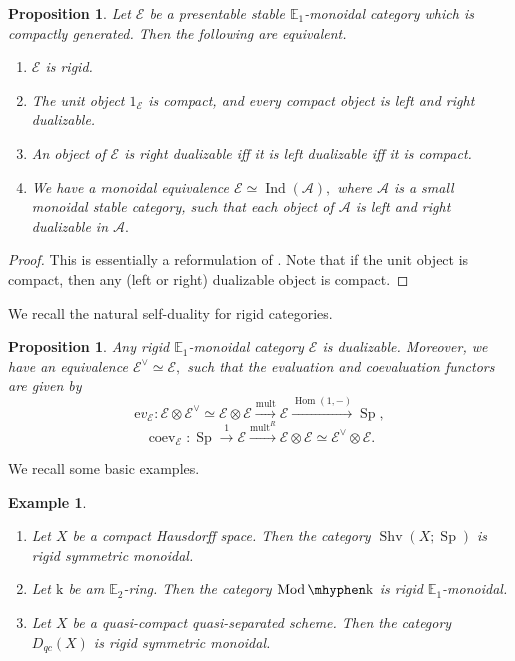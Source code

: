 \documentclass[11pt,leqno]{amsart}
\newtheorem{prop}[theo]{Proposition}
\newtheorem{example}[theo]{Example}
\numberwithin{equation}{section}
\def\Hom{\operatorname{Hom}}
\newcommand{\hy}{\mhyphen}
\newcommand{\xto}{\xrightarrow}
\newcommand{\bE}{{\mathbb E}}
\newcommand{\mk}{\mathrm k}
\newcommand{\ev}{\mathrm ev}
\newcommand{\cA}{{\mathcal A}}
\newcommand{\cE}{{\mathcal E}}
\newcommand{\Shv}{\operatorname{Shv}}
\newcommand{\Sp}{\operatorname{Sp}}
\newcommand{\Ind}{\operatorname{Ind}}
\newcommand{\coev}{\operatorname{coev}}
\newcommand{\Mod}{\operatorname{Mod}}
\newcommand{\mult}{\operatorname{mult}}
\begin{document}
\begin{prop}\cite{GaRo17}
Let $\cE$ be a presentable stable $\bE_1$-monoidal category which is compactly generated. Then the following are equivalent.
\begin{enumerate}[label=(\roman*), ref=(\roman*)]
	\item $\cE$ is rigid.
	
	\item The unit object $1_{\cE}$ is compact, and every compact object is left and right dualizable.
	
	\item An object of $\cE$ is right dualizable iff it is left dualizable iff it is compact.
	
	\item We have a monoidal equivalence $\cE\simeq\Ind(\cA),$ where $\cA$ is a small monoidal stable category, such that each object of $\cA$ is left and right dualizable in $\cA.$
\end{enumerate}
\end{prop}

\begin{proof}
This is essentially a reformulation of \cite[Lemma 9.1.5, Corollary 9.1.7]{GaRo17}. Note that if the unit object is compact, then any (left or right) dualizable object is compact. 
\end{proof}

We recall the natural self-duality for rigid categories.

\begin{prop}\label{prop:rigid_categories_basics}\cite[Section 9.2.1]{GaRo17}
Any rigid $\bE_1$-monoidal category $\cE$ is dualizable. Moreover, we have an equivalence $\cE^{\vee}\simeq\cE,$ such that the evaluation and coevaluation functors are given by
\begin{equation*}
\ev_{\cE}:\cE\otimes\cE^{\vee}\simeq\cE\otimes\cE\xto{\mult}\cE\xto{\Hom(1,-)}\Sp,
\end{equation*}
\begin{equation*}
\coev_{\cE}:\Sp\xto{1}\cE\xto{\mult^R}\cE\otimes\cE\simeq\cE^{\vee}\otimes\cE.
\end{equation*} 
\end{prop}

We recall some basic examples.

\begin{example}
\begin{enumerate}[label=(\roman*), ref=(\roman*)]
	\item Let $X$ be a compact Hausdorff space. Then the category $\Shv(X;\Sp)$ is rigid symmetric monoidal.
	\item Let $\mk$ be am $\bE_2$-ring. Then the category $\Mod\hy \mk$ is rigid $\bE_1$-monoidal.
	\item Let $X$ be a quasi-compact quasi-separated scheme. Then the category $D_{qc}(X)$ is rigid symmetric monoidal.
\end{enumerate}
\end{example}
\end{document}
